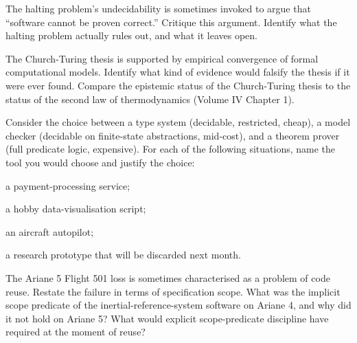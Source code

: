 \begin{exercise}
The halting problem's undecidability is sometimes invoked to argue that ``software cannot be proven correct.'' Critique this argument. Identify what the halting problem actually rules out, and what it leaves open.
\end{exercise}

\begin{exercise}
The Church-Turing thesis is supported by empirical convergence of formal computational models. Identify what kind of evidence would falsify the thesis if it were ever found. Compare the epistemic status of the Church-Turing thesis to the status of the second law of thermodynamics (Volume IV Chapter 1).
\end{exercise}

\begin{exercise}
Consider the choice between a type system (decidable, restricted, cheap), a model checker (decidable on finite-state abstractions, mid-cost), and a theorem prover (full predicate logic, expensive). For each of the following situations, name the tool you would choose and justify the choice: \begin{enumerate*}[label=(\alph*)] \item a payment-processing service; \item a hobby data-visualisation script; \item an aircraft autopilot; \item a research prototype that will be discarded next month. \end{enumerate*}
\end{exercise}

\begin{exercise}
The Ariane 5 Flight 501 loss \cite{acc:ariane501-ifr} is sometimes characterised as a problem of code reuse. Restate the failure in terms of specification scope. What was the implicit scope predicate of the inertial-reference-system software on Ariane 4, and why did it not hold on Ariane 5? What would explicit scope-predicate discipline have required at the moment of reuse?
\end{exercise}
